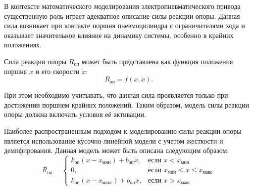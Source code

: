 В контексте математического моделирования электропневматического привода существенную роль играет
адекватное описание силы реакции опоры. Данная сила возникает при контакте поршня пневмоцилиндра
с ограничителями хода и оказывает значительное влияние на динамику системы, особенно в крайних положениях.

Сила реакции опоры $R_\text{оп}$ может быть представлена как функция положения поршня $x$ и его скорости $\dot{x}$:
\begin{equation}
    R_\text{оп} = f(x, \dot{x}).
\end{equation}

При этом необходимо учитывать, что данная сила проявляется только при достижении
поршнем крайних положений. Таким образом, модель силы реакции опоры должна включать
условия её активации.

Наиболее распространенным подходом к моделированию силы реакции опоры является использование кусочно-линейной модели с учетом жесткости и демпфирования. Данная модель может быть описана следующим образом:
\begin{equation}
\label{eq:ch2/support_reaction}
    R_\text{оп} = \begin{cases}
        k_\text{оп}(x - x_\text{мин}) + b_\text{оп}\dot{x},  & \text{если } x < x_\text{мин}                       \\
        0,                                                   & \text{если } x_\text{мин} \leq x \leq x_\text{макс} \\
        k_\text{оп}(x - x_\text{макс}) + b_\text{оп}\dot{x}, & \text{если } x > x_\text{макс}
    \end{cases}
\end{equation}